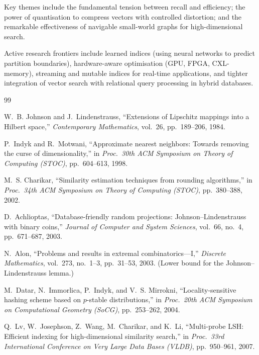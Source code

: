 \documentclass[11pt,a4paper]{article}
\theoremstyle{definition}
\begin{document}
Key themes include the fundamental tension between recall and efficiency;
the power of quantisation to compress vectors with controlled distortion;
and the remarkable effectiveness of navigable small-world graphs for
high-dimensional search.

Active research frontiers include learned indices (using neural networks
to predict partition boundaries), hardware-aware optimisation (GPU,
FPGA, CXL-memory), streaming and mutable indices for real-time
applications, and tighter integration of vector search with relational
query processing in hybrid databases.


\begin{thebibliography}{99}

W.~B. Johnson and J.~Lindenstrauss,
``Extensions of Lipschitz mappings into a Hilbert space,''
\emph{Contemporary Mathematics}, vol.~26, pp.~189--206, 1984.

P.~Indyk and R.~Motwani,
``Approximate nearest neighbors: Towards removing the curse of dimensionality,''
in \emph{Proc.\ 30th ACM Symposium on Theory of Computing (STOC)},
pp.~604--613, 1998.

M.~S. Charikar,
``Similarity estimation techniques from rounding algorithms,''
in \emph{Proc.\ 34th ACM Symposium on Theory of Computing (STOC)},
pp.~380--388, 2002.

D.~Achlioptas,
``Database-friendly random projections: Johnson--Lindenstrauss with binary coins,''
\emph{Journal of Computer and System Sciences}, vol.~66, no.~4,
pp.~671--687, 2003.

N.~Alon,
``Problems and results in extremal combinatorics---I,''
\emph{Discrete Mathematics}, vol.~273, no.~1--3, pp.~31--53, 2003.
(Lower bound for the Johnson--Lindenstrauss lemma.)

M.~Datar, N.~Immorlica, P.~Indyk, and V.~S. Mirrokni,
``Locality-sensitive hashing scheme based on $p$-stable distributions,''
in \emph{Proc.\ 20th ACM Symposium on Computational Geometry (SoCG)},
pp.~253--262, 2004.

Q.~Lv, W.~Josephson, Z.~Wang, M.~Charikar, and K.~Li,
``Multi-probe LSH: Efficient indexing for high-dimensional similarity search,''
in \emph{Proc.\ 33rd International Conference on Very Large Data Bases (VLDB)},
pp.~950--961, 2007.


\end{thebibliography}
\end{document}
